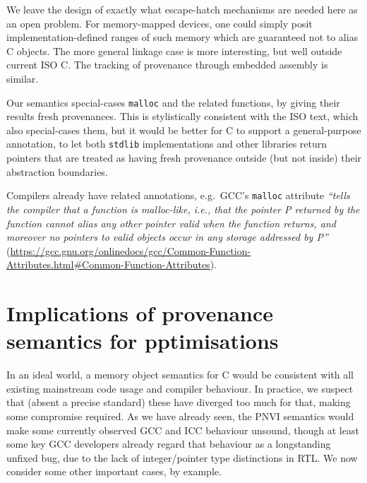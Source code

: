 \documentclass[acmsmall,review,screen]{acmart}\settopmatter{printfolios=true,printccs=false,printacmref=false}
\newcommand{\myparagraph}[1]{\vspace{0.5\baselineskip}\par\noindent{\normalsize\bfseries{#1}}\quad}
\begin{document}
We leave the design of exactly what escape-hatch mechanisms are
needed here as an open
problem.  For memory-mapped devices, one could simply posit
implementation-defined ranges of such memory which are guaranteed not
to alias C objects.  The more general linkage case is more
interesting, but well outside current ISO C.
%
The tracking of provenance through embedded assembly is similar.



\myparagraph{Pointers from allocator libraries}
Our semantics special-cases \lstinline{malloc} and the related
functions, by giving their results fresh provenances.  This is
stylistically consistent with the ISO text, which also special-cases
them, but it would be better for C to support a general-purpose
annotation, to let both \lstinline{stdlib} implementations and other
libraries return pointers that are treated as having fresh provenance
outside (but not inside) their abstraction boundaries.

Compilers already have related annotations, e.g.~GCC's \texttt{malloc}
attribute \emph{``tells the compiler that a function is malloc-like, i.e., that the pointer P returned by the function cannot alias any other pointer valid when the function returns, and moreover no pointers to valid objects occur in any storage addressed by P''}
(\url{https://gcc.gnu.org/onlinedocs/gcc/Common-Function-Attributes.html#Common-Function-Attributes}). 

\section{Implications of provenance semantics for pptimisations}\label{sec:opt}

In an ideal world, a memory object semantics for C would be consistent
with all existing mainstream code usage and compiler behaviour.  In practice, we
suspect that (absent a precise standard) these have
diverged too much for that, making some compromise required. 
As we have already seen, the PNVI semantics would make some currently
observed GCC and ICC behaviour unsound, though at
least some key GCC developers already regard that behaviour as a
longstanding unfixed bug, due to the lack of integer/pointer type
distinctions in RTL.
%
We now consider some other important cases, by example. 
\end{document}
